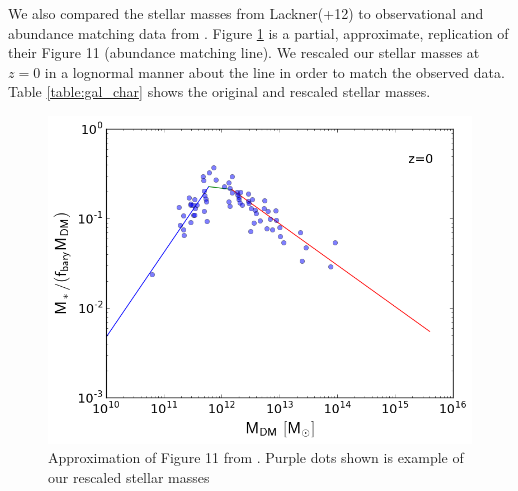 \documentclass[english, apj]{emulateapj}
\begin{document}
We also compared the stellar masses from Lackner\-(+12) to  observational and abundance matching data from \citet{2018AstL...44....8K}. Figure \ref{fig:stellar1} is a partial, approximate, replication of their Figure 11 (abundance matching line).  We rescaled our stellar masses at $z=0$ in a lognormal manner about the line in order to match the observed data.  Table \ref{table:gal_char} shows the original and rescaled stellar masses.

\begin{figure}[htp]
\begin{center}
\includegraphics[width=1.0\columnwidth]{plots/stellar_to_halo_ratio.png}
\caption{Approximation of Figure 11 from \citet{2018AstL...44....8K}.  Purple dots shown is example of our rescaled stellar masses}
\label{fig:stellar1}
\end{center}
\end{figure}
\end{document}
